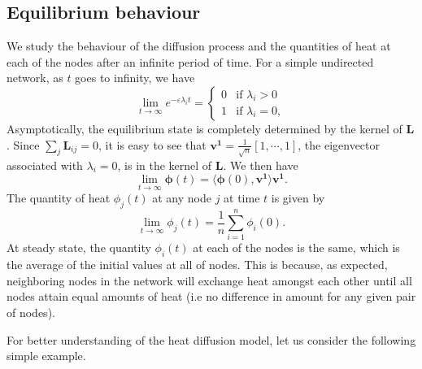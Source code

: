 \documentclass[10pt,a4paper]{article}
\begin{document}
    	 \subsection{ Equilibrium behaviour }
    	 We study the behaviour of the diffusion process and the quantities of heat at each of the nodes after an infinite period of time. 
    	 For a simple undirected network, as $t$ goes to infinity, we have 
    	 \begin{equation}
    	 \lim_{t \to \infty} e^{-\varepsilon\lambda_i t} = \begin{cases} 0 &\mbox{if } \lambda_i > 0 \\
    	 1 & \mbox{if } \lambda_i = 0, \end{cases} 
    	 \end{equation}
    	 Asymptotically, the equilibrium state is completely determined by the kernel of $\mathbf{L}$. Since $\sum_{j} \mathbf{L}_{ij}=0$, it is easy to see that $\mathbf{v^1}= \frac{1}{\sqrt{n}}[1,\cdots,1]$, the eigenvector associated with $\lambda_i =0$, is in the kernel of $\mathbf{L}$. We then have
    	 \begin{equation}
    	 \lim_{t \to \infty}\boldsymbol{\phi}(t) = \langle \boldsymbol{\phi}(0), \mathbf{v^1} \rangle \mathbf{v^1}.
    	 \end{equation}
    	 The quantity of heat $\phi_j(t)$ at any node $j$ at time $t$ is given by
    	 \begin{equation}
    	 \lim_{t \to \infty}\phi_j(t) = \frac{1}{n} \sum_{i = 1}^n \phi_i(0). 
    	 \end{equation}
    	 At steady state, the quantity $\phi_i(t)$ at each of the nodes is the same, which is the average of the initial values at all of nodes. This is because, as expected, neighboring nodes in the network will exchange heat amongst each other until all nodes attain equal amounts of heat (i.e no difference in amount for any given pair of nodes).
    	 
    	 For better understanding of the heat diffusion model, let us consider the following simple example.
    	 
\end{document}
